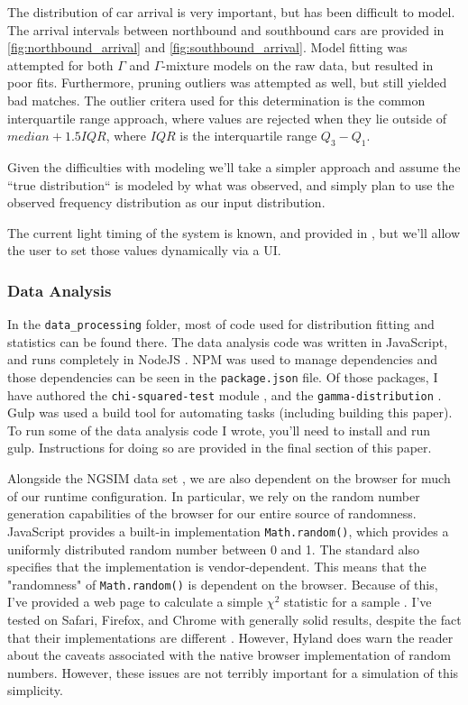 \documentclass[a4paper,12pt]{article}
\begin{document}
The distribution of car arrival is very important, but has been difficult to model. The arrival intervals between 
northbound and southbound cars are provided in \ref{fig:northbound_arrival} and \ref{fig:southbound_arrival}.
Model fitting was attempted for both $\Gamma$ and $\Gamma$-mixture models on the raw data, but resulted in poor
fits. Furthermore, pruning outliers was attempted as well, but still yielded bad matches. The outlier critera used for
this determination is the common interquartile range approach, where values are rejected when
they lie outside of $median + 1.5IQR$, where $IQR$ is the interquartile range $Q_3 - Q_1$.

Given the difficulties with modeling we'll take a simpler approach and assume the ``true distribution`` is modeled by what was observed,
and simply plan to use the observed frequency distribution as our input distribution.

The current light timing of the system is known, and provided in \cite{ngsim}, but we'll allow the user to set
those values dynamically via a UI.

\subsubsection{Data Analysis}
In the \texttt{data\_processing} folder, most of code used for distribution fitting and statistics can be found there.
The data analysis code was written in JavaScript, and runs completely in NodeJS \cite{nodejs}. NPM \cite{npm} was used
to manage dependencies and those dependencies can be seen in the \texttt{package.json} file. Of those packages, I have
authored the \texttt{chi-squared-test} module \cite{chiSquaredNpm}, and the \texttt{gamma-distribution}
\cite{gammaDistributionNpm}. Gulp \cite{gulp} was used a build tool for automating tasks (including building this paper).
To run some of the data analysis code I wrote, you'll need to install and run gulp. Instructions for doing so are
provided in the final section of this paper.

Alongside the NGSIM data set \cite{ngsim}, we are also dependent on the browser for much of our runtime configuration.
In particular, we rely on the random number generation capabilities of the browser for our entire source of randomness.
JavaScript provides a built-in implementation \cite{ecmascriptmath} \texttt{Math.random()}, which provides a uniformly
distributed random number between 0 and 1. The standard also specifies that the implementation is vendor-dependent.
This means that the "randomness" of \texttt{Math.random()} is dependent on the browser. Because of this, I've provided
a web page to calculate a simple $\chi^2$ statistic for a sample \cite{rngtester}. I've tested on Safari, Firefox, and
Chrome with generally solid results, despite the fact that their implementations are different
\cite{rngimplementation}. However, Hyland \cite{rngimplementation} does warn the reader about the caveats associated
with the native browser implementation of random numbers. However, these issues are not terribly important for a
simulation of this simplicity.
\end{document}
